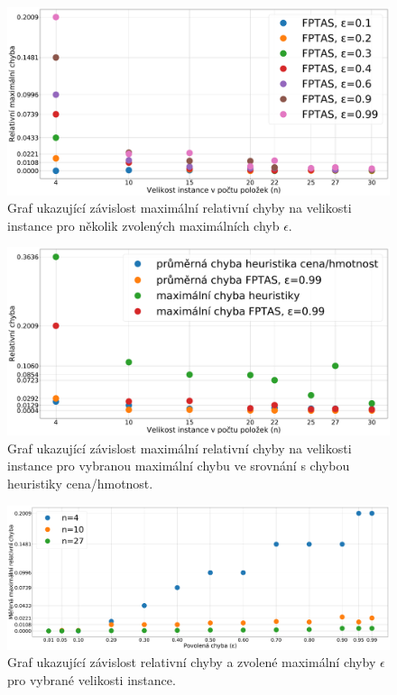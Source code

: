 \documentclass[11pt]{article}
\begin{document}
 \begin{figure}[h]\centering
	\includegraphics[scale=0.2]{img/errorFPTAS}
 	\caption[2]{Graf ukazující závislost maximální relativní chyby na velikosti instance pro několik zvolených maximálních chyb $\epsilon$.}\label{fig:15}
 \end{figure} 	
 \begin{figure}[h]\centering
	\includegraphics[scale=0.2]{img/error}
 	\caption[2]{Graf ukazující závislost maximální relativní chyby na velikosti instance pro vybranou maximální chybu ve srovnání s chybou heuristiky cena/hmotnost.}\label{fig:16}
 \end{figure} 	 
 \begin{figure}[h]\centering
	\includegraphics[scale=0.2]{img/FPTASerrEPS}
 	\caption[2]{Graf ukazující závislost relativní chyby a zvolené maximální chyby $\epsilon$ pro vybrané velikosti instance.}\label{fig:17}
 \end{figure} 	 	 
 
\end{document}
